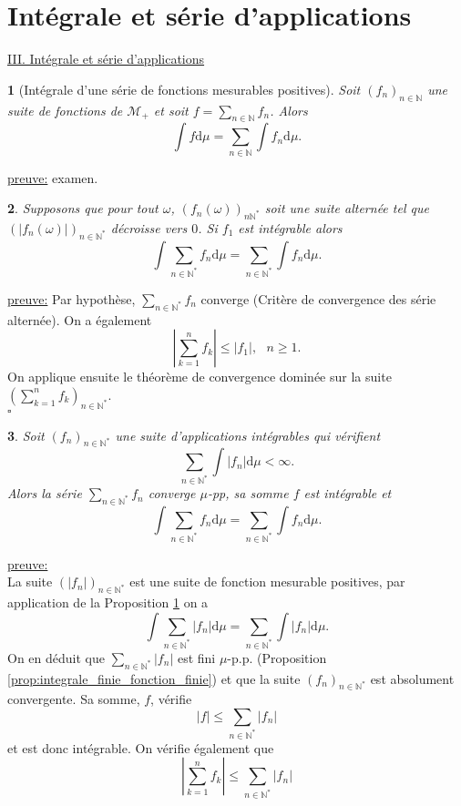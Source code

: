 \documentclass[8pt,notheorems]{beamer}
\def \N{\mathbb N}
\newtheorem{prop}{\translate{Proposition}}
\theoremstyle{definition}
\theoremstyle{example}
\theoremstyle{mystyle}
\theoremstyle{plain}
\begin{document}
\section{Intégrale et série d'applications}
\begin{frame}[allowframebreaks]
\underline{III. Intégrale et série d'applications}\\
\begin{prop}[Intégrale d'une série de fonctions mesurables positives]\label{prop:serie_app_mesurable_positive}
Soit $(f_n)_{n\in\N}$ une suite de fonctions de $\mathcal{M}_+$ et soit $f=\sum_{n\in\N}f_n$. Alors
$$
\int f\text{d}\mu=\sum_{n\in\N}\int f_n\text{d}\mu.
$$
\end{prop}
\underline{preuve:} examen.
\begin{prop}
Supposons que pour tout $\omega$, $(f_n(\omega))_{n\N^\ast}$ soit une suite alternée tel que $(|f_n(\omega)|)_{n\in\N^\ast}$ décroisse vers $0$. Si $f_1$ est intégrable alors 
$$
\int\sum_{n\in\N^\ast}f_n\text{d}\mu
=\sum_{n\in\N^\ast}\int f_n\text{d}\mu.
$$
\end{prop}
\underline{preuve:} Par hypothèse, $\sum_{n\in\N^\ast}f_n$ converge (Critère de convergence des série alternée). On a également 
$$
\left|\sum_{k=1}^{n}f_k\right| \leq |f_1|, \text{ }n\geq1. 
$$
On applique ensuite le théorème de convergence dominée sur la suite $\left(\sum_{k=1}^n f_k\right)_{n\in\N^\ast}$.\\
$\square$\\
\begin{prop}
Soit $(f_n)_{n\in \N^\ast}$ une suite d'applications intégrables qui vérifient 
$$
\sum_{n\in \N^{\ast}}\int|f_n|\text{d}\mu<\infty.
$$
Alors la série $\sum_{n\in\N^{\ast}}f_n$ converge $\mu$-pp, sa somme $f$ est intégrable et
$$
\int\sum_{n\in\N^\ast}f_n\text{d}\mu = \sum_{n\in\N^\ast}\int f_n\text{d}\mu.
$$
\end{prop}
\underline{preuve:}\\
La suite $(|f_n|)_{n\in\N^{\ast}}$ est une suite de fonction mesurable positives, par application de la Proposition \ref{prop:serie_app_mesurable_positive} on a 
$$
\int \sum_{n\in\N^\ast}|f_n|\text{d}\mu = \sum_{n\in\N^\ast}\int |f_n|\text{d}\mu.
$$
On en déduit que $\sum_{n\in\N^\ast}|f_n|$ est fini $\mu$-p.p. (Proposition \ref{prop:integrale_finie_fonction_finie}) et que la suite $(f_n)_{n\in\N^\ast}$ est absolument convergente. Sa somme, $f$, vérifie 
$$
|f|\leq \sum_{n\in\N^\ast}|f_n|
$$ 
et est donc intégrable. On vérifie également que 
$$
\left|\sum_{k=1}^n f_k\right|\leq\sum_{n\in\N^\ast} |f_n|
$$
\end{frame}
\end{document}
